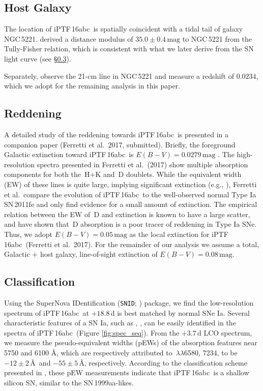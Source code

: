 \documentclass[twocolumn]{aastex61}
\newcommand{\abc}{iPTF\,16abc}
\begin{document}
\subsection{Host Galaxy}
\label{sec:host}

The location of \abc\ is spatially coincident with a tidal tail of
galaxy NGC\,5221. \citet{2007A&A...465...71T} derived a distance
modulus of $35.0\pm0.4\,\textrm{mag}$ to NGC\,5221 from the 
Tully-Fisher relation, which is consistent with what we later derive from the SN light curve (see \S\ref{sec:classification}).

Separately, \citet{2015MNRAS.447.1531C} observe the 21-cm line in
NGC\,5221 and measure a redshift of $0.0234$, which we adopt for the remaining analysis in this paper.

\subsection{Reddening}
\label{sec:reddening}

A detailed study of the reddening towards \abc\ is presented in a 
companion paper (Ferretti et al.\ 2017, submitted). Briefly, the 
foreground Galactic extinction toward \abc\
is $E(B-V) = 0.0279 \, \mathrm{mag}$ \citep{2011ApJ...737..103S}. The high-resolution spectra presented in Ferretti et al.\ (2017) show multiple absorption components for both the \,H$+$K and \,D doublets. While the equivalent width (EW) of these lines is quite large, implying significant extinction (e.g., \citealt{2012MNRAS.426.1465P}), Ferretti et al.\ compare the evolution of \abc\ to the well-observed normal Type Ia SN\,2011fe and only find evidence for a small amount of extinction. The empirical relation between the EW of \,D and extinction is known to have a large scatter, and \citet{2013ApJ...779...38P} have shown that \,D absorption is a poor tracer of reddening in Type Ia SNe. Thus, we adopt $E(B-V) = 0.05 \, \mathrm{mag}$ as the local extinction for \abc\ (Ferretti et al.\ 2017). For the remainder of our analysis we assume a total, Galactic $+$ host galaxy, line-of-sight extinction of $E(B-V) = 0.08 \, \mathrm{mag}$.

\subsection{Classification}
\label{sec:classification}

Using the SuperNova IDentification (\texttt{SNID}; \citealt{2007ApJ...666.1024B}) package, 
we find the low-resolution spectrum of \abc\ at $+18.8$\,d is best matched by normal SNe Ia. Several characteristic features of a SN
Ia, such as , \ion{S}{2}, can be easily identified in the spectra of \abc\ (Figure \ref{fig:spec_seq}). From the $+3.7 \, \mathrm{d}$ LCO spectrum, we measure the pseudo-equivalent widths (pEWs) of the absorption features near 5750 and 6100 \AA, which are respectively attributed to \ion{Si}{2}\,$\lambda\lambda$6580, 7234, to be $-12 \pm 2$\,\AA\ and $-55 \pm 5$\,\AA, respectively. According to the classification scheme presented in \citet{2009PASP..121..238B}, these pEW measurements indicate that \abc\ is a shallow silicon SN, similar to the SN\,1999aa-likes.
\end{document}
